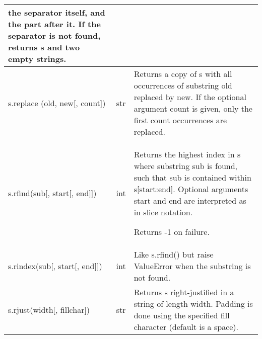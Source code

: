 \begin{center}
{\begin{tabular}{|l|c|p{2.2in}|}
       the separator itself, and the part after it.  If the separator is not
       found, returns s and two empty strings.
\\ \hline
       s.replace (old, new[, count]) & str
&     
       Returns a copy of s with all occurrences of substring
       old replaced by new.  If the optional argument count is
       given, only the first count occurrences are replaced.
\\ \hline
       s.rfind(sub[, start[, end]]) & int
&       
       Returns the highest index in s where substring sub is found,
       such that sub is contained within s[start:end].  Optional
       arguments start and end are interpreted as in slice notation.
       
       Returns -1 on failure.
\\ \hline
       s.rindex(sub[, start[, end]]) & int
&      
       Like s.rfind() but raise ValueError when the substring is not found.
\\ \hline
       s.rjust(width[, fillchar]) & str
&    
       Returns s right-justified in a string of length width. Padding is
       done using the specified fill character (default is a space).
\\ \hline
\end{tabular}}
\end{center}

